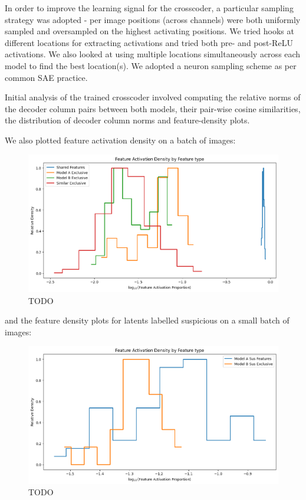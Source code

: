 \documentclass[letterpaper]{article} %
\begin{document}
In order to improve the learning signal for the crosscoder, a particular sampling strategy was adopted - per image positions (across channels) were both uniformly sampled and oversampled on the highest activating positions. We tried hooks at different locations for extracting activations and tried both pre- and post-ReLU activations. We also looked at using multiple locations simultaneously across each model to find the best location(s). We adopted a neuron sampling scheme as per common SAE practice.

Initial analysis of the trained crosscoder involved computing the relative norms of the decoder column pairs between both models, their pair-wise cosine similarities, the distribution of decoder column norms and feature-density plots. 

We also plotted feature activation density on a batch of images:

\begin{figure}[h!]
\centering
\includegraphics[width=\columnwidth]{figures/round_1_feature_activation_density1.png}
\caption{TODO}
\end{figure}

and the feature density plots for latents labelled suspicious on a small batch of images:

\begin{figure}[h!]
\centering
\includegraphics[width=\columnwidth]{figures/round_1_feature_activation_density2.png}
\caption{TODO}
\end{figure}
\end{document}
